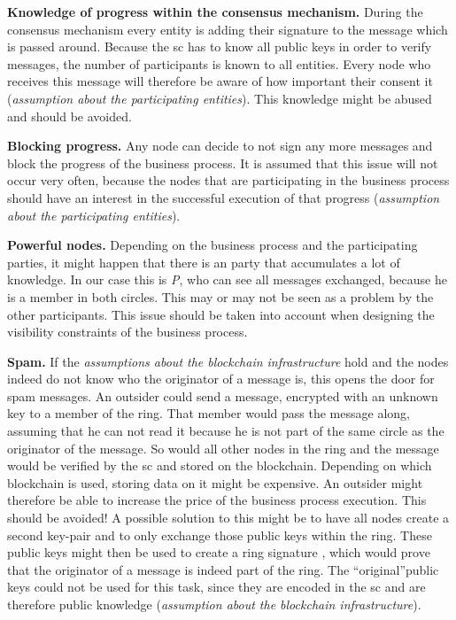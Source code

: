 \documentclass[runningheads]{llncs}
\newcommand{\ber}[1]{\textit{#1}}
\renewcommand{\bigbreak}{}
\newcommand{\quotel}{``}
\newcommand{\quoter}{''}
\begin{document}
\bigbreak
\textbf{Knowledge of progress within the consensus mechanism.} During the consensus mechanism every entity is adding their signature to the message which is passed around. Because the sc has to know all public keys in order to verify messages, the number of participants is known to all entities. Every node who receives this message will therefore be aware of how important their consent it (\textit{assumption about the participating entities}). This knowledge might be abused and should be avoided.


\bigbreak
\textbf{Blocking progress.} Any node can decide to not sign any more messages and block the progress of the business process. It is assumed that this issue will not occur very often, because the nodes that are participating in the business process should have an interest in the successful execution of that progress (\textit{assumption about the participating entities}).


\bigbreak
\textbf{Powerful nodes.} Depending on the business process and the participating parties, it might happen that there is an party that accumulates a lot of knowledge. In our case this is \ber{P}, who can see all messages exchanged, because he is a member in both circles. This may or may not be seen as a problem by the other participants. This issue should be taken into account when designing the visibility constraints of the business process. 


\bigbreak
\textbf{Spam.} If the \textit{assumptions about the blockchain infrastructure} hold and the nodes indeed do not know who the originator of a message is, this opens the door for spam messages. An outsider could send a message, encrypted with an unknown key to a member of the ring. That member would pass the message along, assuming that he can not read it because he is not part of the same circle as the originator of the message. So would all other nodes in the ring and the message would be verified by the sc and stored on the blockchain. Depending on which blockchain is used, storing data on it might be expensive. An outsider might therefore be able to increase the price of the business process execution. This should be avoided! A possible solution to this might be to have all nodes create a second key-pair and to only exchange those public keys within the ring. These public keys might then be used to create a ring signature \cite{rivest2001leak}, which would prove that the originator of a message is indeed part of the ring. The \quotel original\quoter  public keys could not be used for this task, since they are encoded in the sc and are therefore public knowledge (\textit{assumption about the blockchain infrastructure}).
\end{document}
